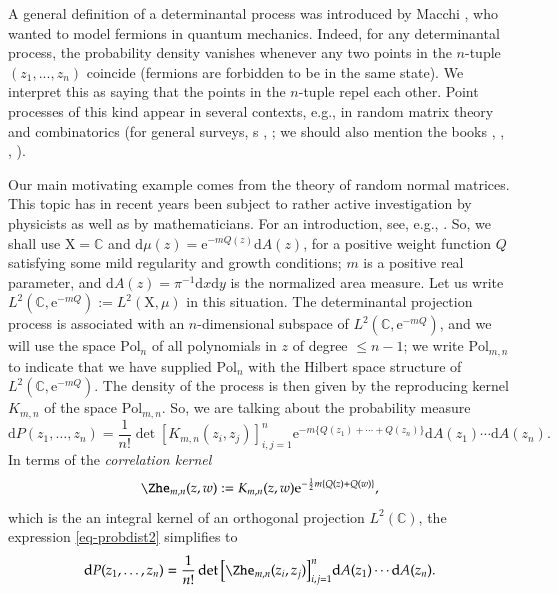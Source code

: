 \documentclass{birkart}
\theoremstyle{definition}
\theoremstyle{remark}
\numberwithin{equation}{section}
\numberwithin{figure}{section}
\newcommand{\e}{\mathrm e}
\newcommand{\1}{{\mathbf 1}}
\newcommand{\C}{{\mathbb C}}
\newcommand{\diff}{{\mathrm d}}
\begin{document}
A general definition of a determinantal process was introduced by Macchi 
\cite{macchi}, who wanted to model fermions in quantum mechanics. Indeed, 
for any determinantal process, the probability density vanishes whenever any
two points in the $n$-tuple $(z_1,...,z_n)$ coincide (fermions are forbidden to
be in the same state). We interpret this as saying that the points in the 
$n$-tuple repel each other. Point processes of this kind appear in several 
contexts, e.g., in random matrix theory and combinatorics (for general 
surveys, s \cite{hkpv}, \cite{bor}; we should also mention the books
\cite{mehta}, \cite{deift}, \cite{deiftgioev}, \cite{AGZ}).  
\medskip

Our main motivating example comes from the theory of random normal 
matrices.  This topic has in recent years been subject to rather active 
investigation by physicists as well as by mathematicians. 
For an introduction, see, e.g., \cite{zabro}. 
So, we shall use $\mathrm{X}=\mathbb{C}$ and 
$\diff\mu(z)= \e^{-mQ(z)}\diff A(z)$, for a positive weight function $Q$ 
satisfying some mild regularity and growth conditions; $m$ is a positive real 
parameter, and $\diff A(z)=\pi^{-1}\diff x \diff y$ is the normalized area 
measure. Let us write $L^2(\mathbb{C}, \e^{-mQ}):=L^2(\mathrm{X},\mu)$ in this
situation.
The determinantal projection process is associated with an $n$-dimensional
subspace of $L^2(\C, \e^{-mQ})$, and we will use the space $\mathrm{Pol}_{n}$ 
of all polynomials in $z$ of degree $\le n-1$; we write $\mathrm{Pol}_{m,n}$ 
to indicate that we have supplied $\mathrm{Pol}_{n}$ with the Hilbert space
structure of $L^2(\mathbb{C}, \e^{-mQ})$.
The density of the process is then given by the reproducing kernel  
$K_{m,n}$ of the space $\mathrm{Pol}_{m,n}$. So, we are talking about the
probability measure
\begin{equation}
\diff P(z_1,\ldots,z_n) = \frac{1}{n!} \det[K_{m,n}(z_i, z_j)]_{i,j=1}^n 
\e^{-m\{Q(z_1)+\cdots+Q(z_n)\}}\diff A(z_1)\cdots\diff A(z_n). 
\label{eq-probdist2}
\end{equation}
In terms of the {\em correlation kernel}
\begin{equation}
\Zhe_{m,n}(z,w):=K_{m,n}(z,w)\e^{-\frac12m\{Q(z)+Q(w)\}}, 
\label{eq-kernel-zhe}
\end{equation}
which is the an integral kernel of an orthogonal projection $L^2(\C)$, 
the expression \eqref{eq-probdist2} simplifies to
\begin{equation}
\diff P(z_1,\ldots,z_n) = \frac{1}{n!} \det\big[\Zhe_{m,n}(z_i, z_j)
\big]_{i,j=1}^n \diff A(z_1)\cdots\diff A(z_n). 
\label{eq-probdist2.5}
\end{equation}
\end{document}
